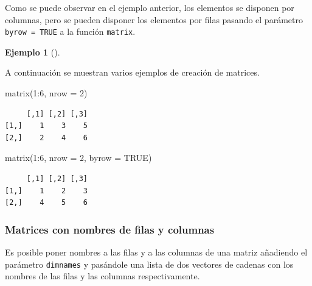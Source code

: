 \documentclass[
  a4paper,
]{scrreport}
\newenvironment{Shaded}{\begin{snugshade}}{\end{snugshade}}
\newcommand{\AttributeTok}[1]{\textcolor[rgb]{0.40,0.45,0.13}{#1}}
\newcommand{\ConstantTok}[1]{\textcolor[rgb]{0.56,0.35,0.01}{#1}}
\newcommand{\DecValTok}[1]{\textcolor[rgb]{0.68,0.00,0.00}{#1}}
\newcommand{\FunctionTok}[1]{\textcolor[rgb]{0.28,0.35,0.67}{#1}}
\newcommand{\NormalTok}[1]{\textcolor[rgb]{0.00,0.23,0.31}{#1}}
\newcommand{\SpecialCharTok}[1]{\textcolor[rgb]{0.37,0.37,0.37}{#1}}
\theoremstyle{definition}
\newtheorem{example}{Ejemplo}[chapter]
\theoremstyle{definition}
\theoremstyle{remark}
\begin{document}
Como se puede observar en el ejemplo anterior, los elementos se disponen
por columnas, pero se pueden disponer los elementos por filas pasando el
parámetro \texttt{byrow\ =\ TRUE} a la función \texttt{matrix}.

\leavevmode{}%
\begin{example}[]\label{exm-creacion-matrices-por-filas}

A continuación se muestran varios ejemplos de creación de matrices.

\begin{Shaded}
\begin{Highlighting}[]
\FunctionTok{matrix}\NormalTok{(}\DecValTok{1}\SpecialCharTok{:}\DecValTok{6}\NormalTok{, }\AttributeTok{nrow =} \DecValTok{2}\NormalTok{)}
\end{Highlighting}
\end{Shaded}

\begin{verbatim}
     [,1] [,2] [,3]
[1,]    1    3    5
[2,]    2    4    6
\end{verbatim}

\begin{Shaded}
\begin{Highlighting}[]
\FunctionTok{matrix}\NormalTok{(}\DecValTok{1}\SpecialCharTok{:}\DecValTok{6}\NormalTok{, }\AttributeTok{nrow =} \DecValTok{2}\NormalTok{, }\AttributeTok{byrow =} \ConstantTok{TRUE}\NormalTok{)}
\end{Highlighting}
\end{Shaded}

\begin{verbatim}
     [,1] [,2] [,3]
[1,]    1    2    3
[2,]    4    5    6
\end{verbatim}

\end{example}

\hypertarget{matrices-con-nombres-de-filas-y-columnas}{%
\subsubsection{Matrices con nombres de filas y
columnas}\label{matrices-con-nombres-de-filas-y-columnas}}

Es posible poner nombres a las filas y a las columnas de una matriz
añadiendo el parámetro \texttt{dimnames} y pasándole una lista de dos
vectores de cadenas con los nombres de las filas y las columnas
respectivamente.
\end{document}
